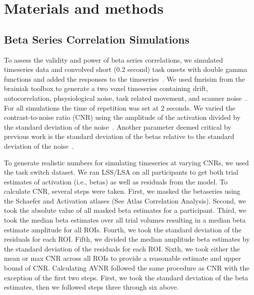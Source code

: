 \documentclass[10pt,letterpaper]{article}
\begin{document}
\section*{Materials and methods}
\subsection*{Beta Series Correlation Simulations}
To assess the validity and power of beta series correlations,
we simulated timeseries data and convolved short (0.2 second) task onsets with double gamma functions
and added the responses to the timeseries~\cite{Glover1999,Welvaert2011}.
We used fmrisim from the brainiak toolbox to generate a two voxel timeseries
containing drift, autocorrelation, phsysiological noise,
task related movement, and scanner noise~\cite{Ellis2020}.
For all simulations the time of repetition was set at 2 seconds.
We varied the contrast-to-noise ratio (CNR) using the amplitude of the activation
divided by the standard deviation of the noise~\cite{Welvaert2013a}.
Another parameter deemed critical by previous work is the standard deviation
of the betas relative to the standard deviation of the noise~\cite{Abdulrahman2016}.

To generate realistic numbers for simulating timeseries at varying CNRs,
we used the task switch dataset.
We ran LSS/LSA on all participants to get both trial estimates of activation (i.e., betas)
as well as residuals from the model.
To calculate CNR, several steps were taken.
First, we masked the betaseries using the Schaefer and Activation atlases (See Atlas Correlation Analysis).
Second, we took the absolute value of all masked beta estimates for a participant.
Third, we took the median beta estimates over all trial volumes resulting
in a median beta estimate amplitude for all ROIs.
Fourth, we took the standard deviation of the residuals for each ROI.
Fifth, we divided the median amplitude beta estimates by the standard deviation of the residuals
for each ROI.
Sixth, we took either the mean or max CNR across all ROIs to provide a reasonable estimate
and upper bound of CNR.
Calculating AVNR followed the same procedure as CNR with the exception of the first two steps.
First, we took the standard deviation of the beta estimates, then we followed steps three through six above.
\end{document}
